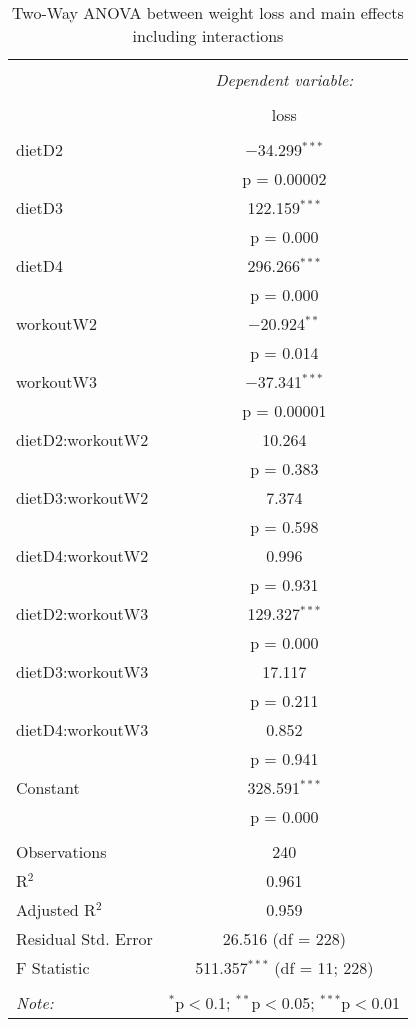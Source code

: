
\begin{table}[!htbp] \centering 
  \caption{Two-Way ANOVA between weight loss and main effects 
          including interactions} 
  \label{tab::full_2} 
\begin{tabular}{@{\extracolsep{5pt}}lc} 
\\[-1.8ex]\hline 
\hline \\[-1.8ex] 
 & \multicolumn{1}{c}{\textit{Dependent variable:}} \\ 
\cline{2-2} 
\\[-1.8ex] & loss \\ 
\hline \\[-1.8ex] 
 dietD2 & $-$34.299$^{***}$ \\ 
  & p = 0.00002 \\ 
  dietD3 & 122.159$^{***}$ \\ 
  & p = 0.000 \\ 
  dietD4 & 296.266$^{***}$ \\ 
  & p = 0.000 \\ 
  workoutW2 & $-$20.924$^{**}$ \\ 
  & p = 0.014 \\ 
  workoutW3 & $-$37.341$^{***}$ \\ 
  & p = 0.00001 \\ 
  dietD2:workoutW2 & 10.264 \\ 
  & p = 0.383 \\ 
  dietD3:workoutW2 & 7.374 \\ 
  & p = 0.598 \\ 
  dietD4:workoutW2 & 0.996 \\ 
  & p = 0.931 \\ 
  dietD2:workoutW3 & 129.327$^{***}$ \\ 
  & p = 0.000 \\ 
  dietD3:workoutW3 & 17.117 \\ 
  & p = 0.211 \\ 
  dietD4:workoutW3 & 0.852 \\ 
  & p = 0.941 \\ 
  Constant & 328.591$^{***}$ \\ 
  & p = 0.000 \\ 
 \hline \\[-1.8ex] 
Observations & 240 \\ 
R$^{2}$ & 0.961 \\ 
Adjusted R$^{2}$ & 0.959 \\ 
Residual Std. Error & 26.516 (df = 228) \\ 
F Statistic & 511.357$^{***}$ (df = 11; 228) \\ 
\hline 
\hline \\[-1.8ex] 
\textit{Note:}  & \multicolumn{1}{r}{$^{*}$p$<$0.1; $^{**}$p$<$0.05; $^{***}$p$<$0.01} \\ 
\end{tabular} 
\end{table} 
